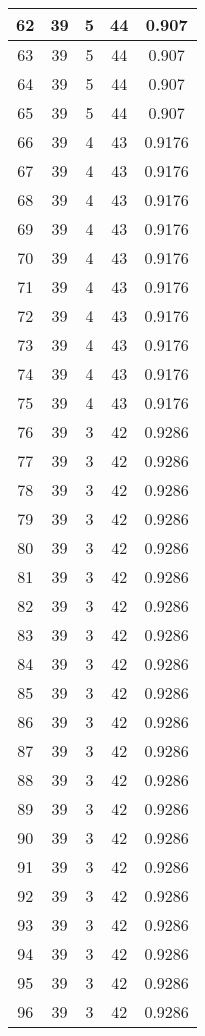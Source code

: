 \documentclass[letterpaper, 12pt]{article}
\begin{document}
\begin{longtable}{|c|c|c|c|c|}
\hline
62 & 39 & 5 & 44 & 0.907 \\
\hline
63 & 39 & 5 & 44 & 0.907 \\
\hline
64 & 39 & 5 & 44 & 0.907 \\
\hline
65 & 39 & 5 & 44 & 0.907 \\
\hline
66 & 39 & 4 & 43 & 0.9176 \\
\hline
67 & 39 & 4 & 43 & 0.9176 \\
\hline
68 & 39 & 4 & 43 & 0.9176 \\
\hline
69 & 39 & 4 & 43 & 0.9176 \\
\hline
70 & 39 & 4 & 43 & 0.9176 \\
\hline
71 & 39 & 4 & 43 & 0.9176 \\
\hline
72 & 39 & 4 & 43 & 0.9176 \\
\hline
73 & 39 & 4 & 43 & 0.9176 \\
\hline
74 & 39 & 4 & 43 & 0.9176 \\
\hline
75 & 39 & 4 & 43 & 0.9176 \\
\hline
76 & 39 & 3 & 42 & 0.9286 \\
\hline
77 & 39 & 3 & 42 & 0.9286 \\
\hline
78 & 39 & 3 & 42 & 0.9286 \\
\hline
79 & 39 & 3 & 42 & 0.9286 \\
\hline
80 & 39 & 3 & 42 & 0.9286 \\
\hline
81 & 39 & 3 & 42 & 0.9286 \\
\hline
82 & 39 & 3 & 42 & 0.9286 \\
\hline
83 & 39 & 3 & 42 & 0.9286 \\
\hline
84 & 39 & 3 & 42 & 0.9286 \\
\hline
85 & 39 & 3 & 42 & 0.9286 \\
\hline
86 & 39 & 3 & 42 & 0.9286 \\
\hline
87 & 39 & 3 & 42 & 0.9286 \\
\hline
88 & 39 & 3 & 42 & 0.9286 \\
\hline
89 & 39 & 3 & 42 & 0.9286 \\
\hline
90 & 39 & 3 & 42 & 0.9286 \\
\hline
91 & 39 & 3 & 42 & 0.9286 \\
\hline
92 & 39 & 3 & 42 & 0.9286 \\
\hline
93 & 39 & 3 & 42 & 0.9286 \\
\hline
94 & 39 & 3 & 42 & 0.9286 \\
\hline
95 & 39 & 3 & 42 & 0.9286 \\
\hline
96 & 39 & 3 & 42 & 0.9286 \\

\end{longtable}
\end{document}
